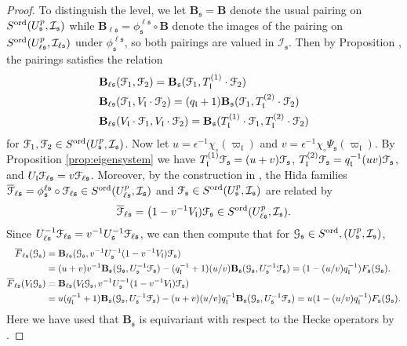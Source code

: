 \documentclass[leqno]{amsart}
\theoremstyle{definition}
\theoremstyle{remark}
\newcommand{\fl}{\mathfrak{l}}
\newcommand{\fn}{\mathfrak{n}}
\newcommand{\fs}{\mathfrak{s}}
\newcommand{\euF}{\EuScript{F}} %
\newcommand{\I}{\mathcal{I}} %
\newcommand{\ord}{\textnormal{ord}} %
\begin{document}
\begin{proof}

To distinguish the level, 
we let $\mathbf{B}_\fs=\mathbf{B}$ denote 
the usual pairing on $S^{\ord}(U^p_\fs, \I_\fs)$
while $\mathbf{B}_{\ell\fs}=\phi^{\ell\fs}_\fs\circ \mathbf{B}$
denote the images of the pairing on 
$S^{\ord}(U^p_{\ell\fs}, \I_{\ell\fs})$ under $\phi^{\ell\fs}_\fs$,
so both pairings are valued in $\I_\fs$.
Then by Proposition \cite[Prop 5.12]{lee},
the pairings satisfies the relation
\begin{align*}
	&\mathbf{B}_{\ell\fs}(\euF_1,\euF_2)=
	\mathbf{B}_{\fs}(\euF_1,T_{\fl}^{(1)}\cdot \euF_2)\\
	&\mathbf{B}_{\ell\fs}(\euF_1,V_{\fl}\cdot\euF_2)=
	(q_\fl+1) \mathbf{B}_{\fs}(\euF_1, T_{\fl}^{(2)}\cdot\euF_2)\\
	&\mathbf{B}_{\ell\fs}
	(V_{\fl}\cdot \euF_1,V_{\fl}\cdot\euF_2)=
	\mathbf{B}_{\fs} (T_{\fl}^{(1)}\cdot\euF_1,
	T_{\fl}^{(2)}\cdot \euF_2)
\end{align*} 
for $\euF_1,\euF_2\in S^{\ord}(U^p_\fs,\I_\fs)$.
Now let $u=\epsilon^{-1}\chi_\circ(\varpi_\fl)$
and $v=\epsilon^{-1}\chi_\circ\Psi_\fs(\varpi_\fl)$.
By Proposition \ref{prop:eigensystem}
we have $T_\fl^{(1)}\euF_\fs=(u+v)\euF_\fs$,
$T_\fl^{(2)}\euF_\fs=q_\fl^{-1}(uv)\euF_\fs$, and
$U_\fl\euF_{\ell\fs}=v\euF_{\ell\fs}$.
Moreover, by the construction in \cite{lee}, the Hida families
$\overline{\euF}_{\ell\fs}=\phi^{\ell\fs}_\fs\circ \euF_{\ell\fs}\in S^{\ord}(U^p_{\ell\fs}, \I_\fs)$ and
$\euF_\fs\in S^{\ord}(U^p_{\fs}, \I_\fs)$ are related by
\begin{equation}\label{eq:compare_level}
    \overline{\euF}_{\ell\fs}=
	\big(1-v^{-1}V_\fl)\euF_{\fs}
    \in S^{\ord}(U^p_{\ell\fs},\I_\fs).
\end{equation}
Since $U_{\ell\fs}^{-1}\euF_{\ell\fs}=v^{-1}U_{\fs}^{-1}\euF_{\ell\fs}$,
we can then compute that for $\EuScript{G}_{\fs}\in S^{\ord},(U^p_{\fs},\I_\fs)$, 
\begin{align*}
\overline{F}_{\ell\fs}(\EuScript{G}_{\fs})&=
\mathbf{B}_{\ell\fs}(\EuScript{G}_{\fs},
v^{-1}U_\fs^{-1}(1-v^{-1}V_\fl)\euF_\fs)\\&=
(u+v)v^{-1}
\mathbf{B}_\fs(\EuScript{G}_{\fs},U_\fs^{-1}\euF_\fs)-
(q_\fl^{-1}+1)(u/v)
\mathbf{B}_\fs(\EuScript{G}_{\fs}, U_\fs^{-1}\euF_\fs)=
(1-(u/v)q_\fl^{-1})F_\fs(\EuScript{G}_\fs).\\
\overline{F}_{\ell\fs}(V_\fl\EuScript{G}_{\fs})&=
\mathbf{B}_{\ell\fs}(V_\fl\EuScript{G}_{\fs},
v^{-1}U_\fs^{-1}(1-v^{-1}V_\fl)\euF_\fs)\\&=
u(q_\fl^{-1}+1)
\mathbf{B}_\fs(\EuScript{G}_{\fs},U_\fs^{-1}\euF_\fs)-
(u+v)(u/v)q_\fl^{-1}
\mathbf{B}_\fs(\EuScript{G}_{\fs}, U_\fs^{-1}\euF_\fs)=
u(1-(u/v)q_\fl^{-1})F_\fs(\EuScript{G}_\fs).
\end{align*}
Here we have used that $\mathbf{B}_\fs$
is equivariant with respect to the Hecke operators
by \cite[Rmk 5.13]{lee}.

\end{proof}
\end{document}
